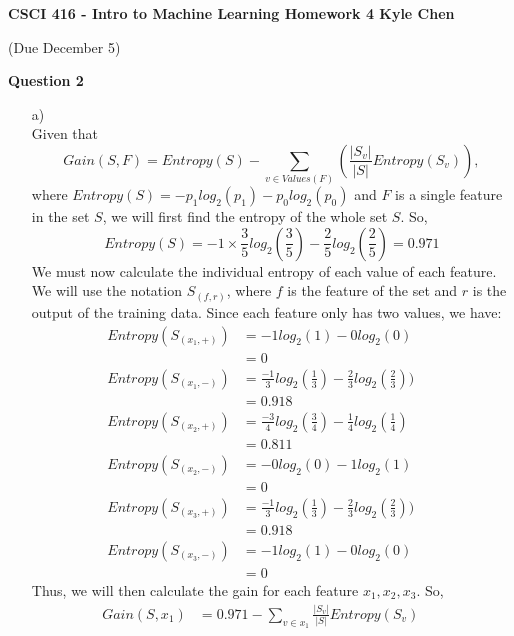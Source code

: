 \documentclass[12pt]{article} %
\begin{document}
 
\noindent
\textbf{CSCI 416 - Intro to Machine Learning \quad 
Homework 4 \hfill Kyle Chen}\\
\begin{center}
  (Due December 5)
\end{center}
\bigskip

\begin{flushleft} %

\textbf{Question 2} 

\begin{enumerate}
	\item[a)]\ \\
		Given that \[Gain(S, F) = Entropy(S) - \sum_{v \in Values(F)} (\frac{|S_v|}{|S|}Entropy(S_v)),\] where $Entropy(S) = -p_1log_2(p_1) - p_0log_2(p_0)$ and $F$ is a single feature in the set $S$, we will first find the entropy of the whole set $S$. So, \[Entropy(S) = -1\times\frac{3}{5}log_2(\frac{3}{5}) - \frac{2}{5}log_2(\frac{2}{5}) = 0.971\]
		We must now calculate the individual entropy of each value of each feature. We will use the notation $S_{(f, r)}$, where $f$ is the feature of the set and $r$ is the output of the training data. Since each feature only has two values, we have:
		\begin{align*}
			Entropy(S_{(x_1, +)}) &= -1 log_2(1) - 0 log_2(0) &&\\
			&= 0 &&\\
			Entropy(S_{(x_1, -)}) &= \frac{-1}{3}log_2(\frac{1}{3}) - \frac{2}{3}log_2(\frac{2}{3})) &&\\
			&= 0.918 &&\\
			Entropy(S_{(x_2, +)}) &= \frac{-3}{4}log_2(\frac{3}{4}) - \frac{1}{4}log_2(\frac{1}{4})&&\\
			&= 0.811 &&\\
			Entropy(S_{(x_2,-)}) &= -0log_2(0) - 1log_2(1)&&\\
			&= 0 &&\\
			Entropy(S_{(x_3,+)}) &= \frac{-1}{3}log_2(\frac{1}{3}) - \frac{2}{3}log_2(\frac{2}{3})) &&\\
			&= 0.918 &&\\
			Entropy(S_{(x_3, -)}) &= -1 log_2(1) - 0 log_2(0) &&\\
			&= 0
		\end{align*}
		Thus, we will then calculate the gain for each feature $x_1, x_2, x_3$. So,
		\begin{align*}
			Gain(S, x_1) &= 0.971 - \sum_{v\in x_1} \frac{|S_v|}{|S|}Entropy(S_v) &&\\

\end{align*}
\end{enumerate}
\end{flushleft}
\end{document}
